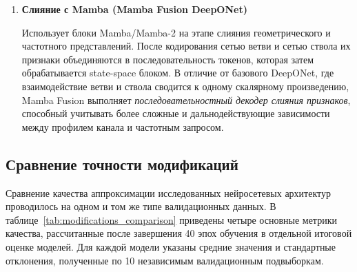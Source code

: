 \begin{enumerate}
    \item \textbf{Слияние с Mamba (Mamba Fusion DeepONet)}~\cite{dao2024mamba2,gu2024mamba}
    
    Использует блоки Mamba/Mamba-2 на этапе слияния геометрического и частотного представлений. После кодирования сетью ветви и сетью ствола их признаки объединяются в последовательность токенов, которая затем обрабатывается state-space блоком. В отличие от базового DeepONet, где взаимодействие ветви и ствола сводится к одному скалярному произведению, Mamba Fusion выполняет \emph{последовательностный декодер слияния признаков}, способный учитывать более сложные и дальнодействующие зависимости между профилем канала и частотным запросом.
\end{enumerate}

\subsection{Сравнение точности модификаций}
\label{subsec:modifications_comparison}

Сравнение качества аппроксимации исследованных нейросетевых архитектур проводилось на одном и том же типе валидационных данных. В таблице~\ref{tab:modifications_comparison} приведены четыре основные метрики качества, рассчитанные после завершения 40 эпох обучения в отдельной итоговой оценке моделей. Для каждой модели указаны средние значения и стандартные отклонения, полученные по 10 независимым валидационным подвыборкам.


